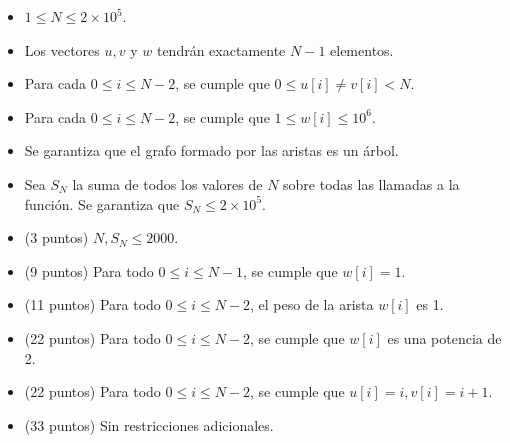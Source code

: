 \documentclass[12pt]{scrartcl}
\begin{document}
        \begin{itemize}
            \item $1 \le N \le 2\times10^5$.
            \item Los vectores $u, v$ y $w$ tendrán exactamente $N - 1$ elementos.
            \item Para cada $0 \le i \le N - 2$, se cumple que $0 \le u[i] \neq v[i] < N$. 
            \item Para cada $0 \le i \le N - 2$, se cumple que $1 \le w[i] \le 10^6$.
            \item Se garantiza que el grafo formado por las aristas es un árbol.
            \item Sea $S_N$ la suma de todos los valores de $N$ sobre todas las llamadas a la función. Se garantiza que $S_N \le 2\times 10^5$.
        \end{itemize}
    


    \begin{itemize}
        \item (3 puntos) $N, S_N \le 2000$.
        \item (9 puntos) Para todo $0 \le i \le N - 1$, se cumple que $w[i] = 1$.
        \item (11 puntos) Para todo $0 \le i \le N - 2$, el peso de la arista $w[i]$ es 1.
        \item (22 puntos) Para todo $0 \le i \le N - 2$, se cumple que $w[i]$ es una potencia de 2.
        \item (22 puntos) Para todo $0 \le i \le N - 2$, se cumple que $u[i] = i, v[i] = i + 1$.
        \item (33 puntos) Sin restricciones adicionales.
    \end{itemize}
\end{document}
